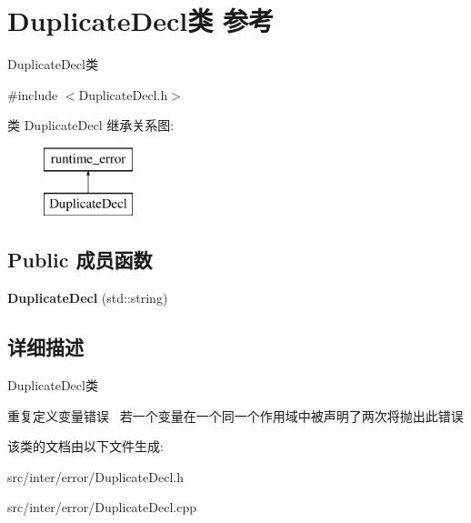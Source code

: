 \hypertarget{class_duplicate_decl}{}\section{Duplicate\+Decl类 参考}
\label{class_duplicate_decl}


Duplicate\+Decl类  




{\ttfamily \#include $<$Duplicate\+Decl.\+h$>$}

类 Duplicate\+Decl 继承关系图\+:\begin{figure}[H]
\begin{center}
\leavevmode
\includegraphics[height=2.000000cm]{class_duplicate_decl}
\end{center}
\end{figure}
\subsection*{Public 成员函数}
\begin{DoxyCompactItemize}
\item 
{\bfseries Duplicate\+Decl} (std\+::string)\hypertarget{class_duplicate_decl_a101a07d46a713363621da69f46a711b3}{}\label{class_duplicate_decl_a101a07d46a713363621da69f46a711b3}

\end{DoxyCompactItemize}


\subsection{详细描述}
Duplicate\+Decl类 

重复定义变量错误~\newline
若一个变量在一个同一个作用域中被声明了两次将抛出此错误 

该类的文档由以下文件生成\+:\begin{DoxyCompactItemize}
\item 
src/inter/error/Duplicate\+Decl.\+h\item 
src/inter/error/Duplicate\+Decl.\+cpp\end{DoxyCompactItemize}
